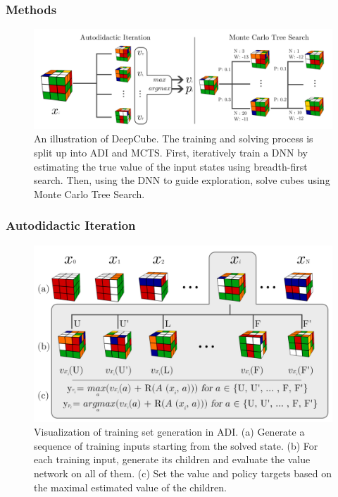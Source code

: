 \documentclass[notheorems, aspectratio=54]{beamer}
\begin{document}
\begin{frame}
    \frametitle{Methods}

    \begin{figure}
        \includegraphics[width=\textwidth]{fig/deepcube_method.png}
        \caption{An illustration of DeepCube. The training and solving process is split up into ADI and MCTS. First, iteratively train a DNN by estimating the true value of the input states using breadth-first search. Then, using the DNN to guide exploration, solve cubes using Monte Carlo Tree Search.}
    \end{figure}
\end{frame}

\begin{frame}
    \frametitle{Autodidactic Iteration} %

    \begin{figure}
        \includegraphics[width=.8\textwidth]{fig/autodidactic_iteration.png}
        \caption{Visualization of training set generation in ADI. (a) Generate a sequence of training inputs starting from the solved state. (b) For each training input, generate its children and evaluate the value network on all of them. (c) Set the value and policy targets based on the maximal estimated value of the children.}
    \end{figure}
\end{frame}
\end{document}
